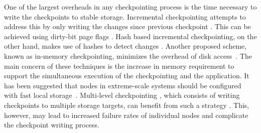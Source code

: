 One of the largest overheads in any checkpointing process is the time necessary to write the checkpoints
to stable storage. Incremental checkpointing attempts
to address this by only writing the changes since previous checkpoint \cite{Agarwal:04:Adaptive,elnozahy_1992_manetho,li_trans_1994}. 
This can be achieved using dirty-bit page flags \cite{plank_ftcs_1994,elnozahy_1992_manetho}. Hash based incremental checkpointing, on the other hand, makes use of hashes to detect changes \cite{nam_ftc_1997,Agarwal:04:Adaptive}. 
Another proposed scheme, known as in-memory checkpointing, minimizes the overhead of disk access~\cite{zheng_2004_ftccharm,6264677}.
The main concern of these techniques is the increase in
memory requirement to support the simultaneous execution of the checkpointing and the application. 
It has been suggested that nodes in extreme-scale systems should be configured with fast local storage~\cite{doe_ascr_exascale_2011}. 
Multi-level checkpointing , which consists of
writing checkpoints to multiple storage targets, 
can benefit from such a strategy \cite{Moody:10:SCR}. This,
however, may lead to increased failure rates of individual nodes and complicate the checkpoint writing process.


